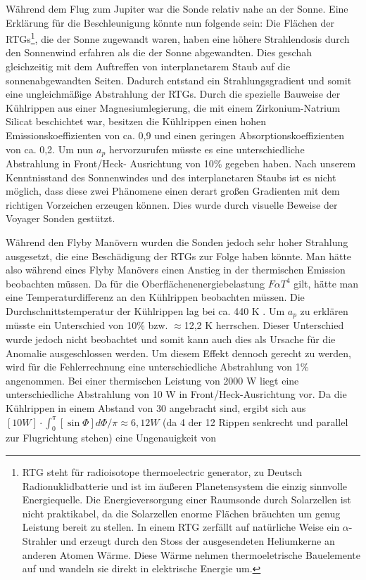 W\"ahrend dem Flug zum Jupiter war die Sonde relativ nahe an der Sonne.
Eine Erkl\"arung f\"ur die Beschleunigung k\"onnte nun folgende sein:
Die Fl\"achen der RTGs\footnote{RTG steht für radioisotope thermoelectric generator, zu Deutsch Radionuklidbatterie und ist im äußeren Planetensystem die einzig sinnvolle Energiequelle. Die Energieversorgung einer Raumsonde durch Solarzellen ist nicht praktikabel, da die Solarzellen enorme Flächen bräuchten um genug Leistung bereit zu stellen. In einem RTG zerfällt auf natürliche Weise ein $\alpha$-Strahler und erzeugt durch den Stoss der ausgesendeten Heliumkerne an anderen Atomen Wärme. Diese W\"arme nehmen thermoeletrische Bauelemente auf und wandeln sie direkt in elektrische Energie um.}, die der Sonne zugewandt waren, haben eine
h\"ohere Strahlendosis durch den Sonnenwind erfahren als die der Sonne
abgewandten. Dies geschah gleichzeitig mit dem Auftreffen von interplanetarem Staub auf die sonnenabgewandten Seiten. Dadurch entstand ein
Strahlungsgradient und somit eine ungleichm\"a{\ss}ige Abstrahlung der
RTGs. Durch die spezielle Bauweise der K\"uhlrippen aus einer
Magnesiumlegierung, die mit einem Zirkonium-Natrium Silicat beschichtet
war, besitzen die K\"uhlrippen einen hohen Emissionskoeffizienten
von ca. 0,9 und einen geringen Absorptionskoeffizienten von ca. 0,2. Um
nun $a_{p}$ hervorzurufen m\"usste es eine unterschiedliche
Abstrahlung in Front/Heck- Ausrichtung von 10\% gegeben haben. Nach
unserem Kenntnisstand des Sonnenwindes und des interplanetaren Staubs
ist es nicht m\"oglich, dass diese zwei Ph\"anomene einen derart
gro{\ss}en Gradienten mit dem richtigen Vorzeichen erzeugen k\"onnen.
Dies wurde durch visuelle Beweise der Voyager Sonden gest\"utzt\cite{Anderson2002}.

W\"ahrend den Flyby Man\"overn wurden die Sonden jedoch sehr hoher
Strahlung ausgesetzt, die eine Besch\"adigung der RTGs zur Folge haben
k\"onnte. Man h\"atte also w\"ahrend eines Flyby Man\"overs einen
Anstieg in der thermischen Emission beobachten m\"ussen. Da f\"ur die
Oberfl\"achenenergiebelastung $F\alpha T^{4}$ gilt, h\"atte man eine
Temperaturdifferenz an den K\"uhlrippen beobachten m\"ussen. Die
Durchschnittstemperatur der K\"uhlrippen lag bei ca. 440 K \cite{Anderson2002}. Um
$a_{p}$ zu erkl\"aren m\"usste ein Unterschied von 10\% bzw. $\approx$12,2 K
herrschen. Dieser Unterschied wurde jedoch nicht beobachtet und somit
kann auch dies als Ursache f\"ur die Anomalie ausgeschlossen werden. Um
diesem Effekt dennoch gerecht zu werden, wird f\"ur die Fehlerrechnung
eine unterschiedliche Abstrahlung von 1\% angenommen. Bei einer
thermischen Leistung von 2000 W liegt eine unterschiedliche Abstrahlung
von 10 W in Front/Heck-Ausrichtung vor. Da die K\"uhlrippen in einem
Abstand von 30{\textdegree} angebracht sind, ergibt sich aus
$[10W]\cdot \int _{0}^{\pi }[\sin \Phi ]d\Phi /\pi \approx
6,12W$\cite{Anderson2002} (da 4 der 12 Rippen senkrecht und parallel zur Flugrichtung
stehen) eine Ungenauigkeit von

